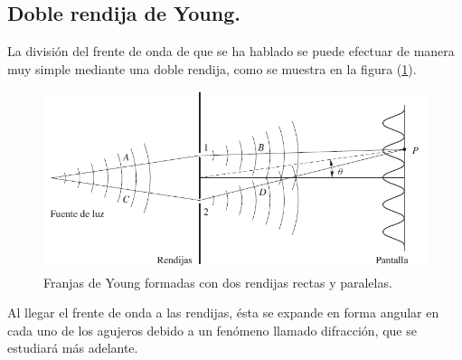 \documentclass[14pt]{extarticle}
\begin{document}
\subsection{Doble rendija de Young.}

La división del frente de onda de que se ha hablado se puede efectuar de manera muy simple mediante una doble rendija, como se muestra en la figura (\ref{fig:figura_IX_02}).
\begin{figure}[H]
    \centering
    \includegraphics[scale=0.7]{Imagenes/Interferencia_02.png}
    \caption{Franjas de Young formadas con dos rendijas rectas y paralelas.}
    \label{fig:figura_IX_02}
\end{figure}
Al llegar el frente de onda a las rendijas, ésta se expande en forma angular en cada uno de los agujeros debido a un fenómeno llamado difracción, que se estudiará más adelante.
\end{document}
